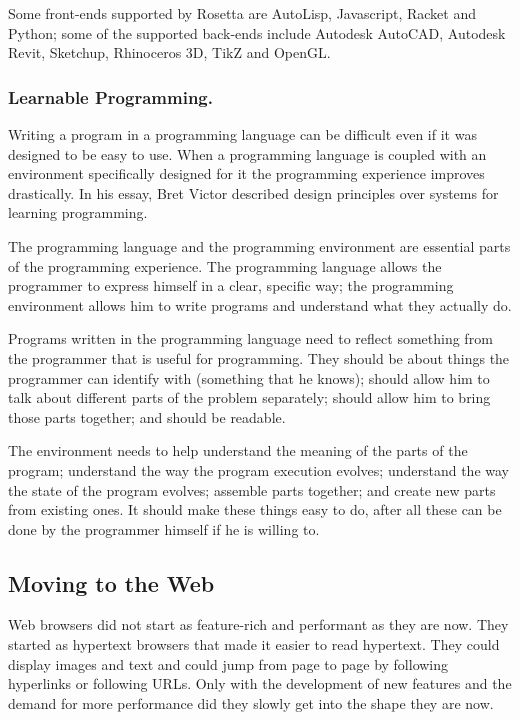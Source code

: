 \documentclass{./llncs2e/llncs}
\begin{document}
	Some front-ends supported by Rosetta are AutoLisp, Javascript, Racket and Python; some of the supported back-ends include Autodesk AutoCAD, Autodesk Revit, Sketchup, Rhinoceros 3D, TikZ and OpenGL.
	

\subsubsection{Learnable Programming.}
	Writing a program in a programming language can be difficult even if it was designed to be easy to use. 
	When a programming language is coupled with an environment specifically designed for it the programming experience improves drastically. 
	In his essay\cite{victor2012learnable}, Bret Victor described design principles over systems for learning programming.
	
	The programming language and the programming environment are essential parts of the programming experience.
	The programming language allows the programmer to express himself in a clear, specific way; the programming environment allows him to write programs and understand what they actually do.
	
	
	Programs written in the programming language need to reflect something from the programmer that is useful for programming.
	They should be about things the programmer can identify with (something that he knows); should allow him to talk about different parts of the problem separately; should allow him to bring those parts together; and should be readable.
	
	The environment needs to help understand the meaning of the parts of the program; understand the way the program execution evolves; understand the way the state of the program evolves; assemble parts together; and create new parts from existing ones.
	It should make these things easy to do, after all these can be done by the programmer himself if he is willing to.

\subsection{Moving to the Web}
	Web browsers did not start as feature-rich and performant as they are now.
	They started as hypertext browsers that made it easier to read hypertext.
	They could display images and text and could jump from page to page by following hyperlinks or following URLs.
	Only with the development of new features and the demand for more performance did they slowly get into the shape they are now.
\end{document}
